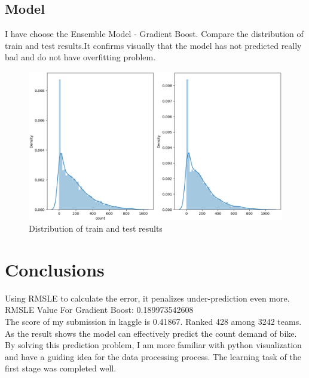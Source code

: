 \documentclass{amsart}
\begin{document}
\subsection{Model}
I have choose the Ensemble Model - Gradient Boost. Compare the distribution of train and test results.It confirms visually that the model has not predicted really bad and do not have overfitting problem.
\begin{figure}[htbp]
	\includegraphics[scale=0.4]{./figure/models_Figure_1.eps}
	\caption{Distribution of train and test results}
\end{figure}

\section{Conclusions} \label{sec-conclusions}
Using RMSLE to calculate the error, it penalizes under-prediction even more.\\
RMSLE Value For Gradient Boost:  0.189973542608\\
The score of my submission in kaggle is 0.41867. Ranked 428 among 3242 teams.\\

As the result shows the model can effectively predict the count demand of bike. By solving this prediction problem, I am more familiar with python visualization and have a guiding idea for the data processing process. The learning task of the first stage was completed well.







\newpage



\end{document}
